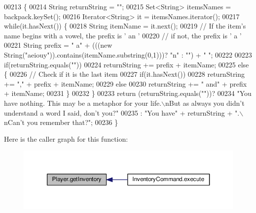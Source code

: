 \begin{DoxyCode}
00213                                  \{
00214         String returnString = \textcolor{stringliteral}{""};
00215         Set<String> itemsNames = backpack.keySet();
00216         Iterator<String> it = itemsNames.iterator();
00217         \textcolor{keywordflow}{while}(it.hasNext()) \{
00218             String itemName = it.next();
00219             \textcolor{comment}{// If the item's name begins with a vowel, the prefix is ' an '}
00220             \textcolor{comment}{// if not, the prefix is ' a '}
00221             String prefix = \textcolor{stringliteral}{" a"} + (((\textcolor{keyword}{new} String(\textcolor{stringliteral}{"aeiouy"})).contains(itemName.substring(0,1)))? \textcolor{stringliteral}{"n"} : \textcolor{stringliteral}{""}) +
       \textcolor{stringliteral}{" "};
00222 
00223             \textcolor{keywordflow}{if}(returnString.equals(\textcolor{stringliteral}{""}))
00224                 returnString += prefix + itemName;
00225             \textcolor{keywordflow}{else} \{
00226                 \textcolor{comment}{// Check if it is the last item}
00227                 \textcolor{keywordflow}{if}(it.hasNext())
00228                     returnString += \textcolor{stringliteral}{","} + prefix + itemName;
00229                 \textcolor{keywordflow}{else}
00230                     returnString += \textcolor{stringliteral}{" and"} + prefix + itemName;
00231             \}
00232         \}
00233         \textcolor{keywordflow}{return} (returnString.equals(\textcolor{stringliteral}{""}))?
00234             \textcolor{stringliteral}{"You have nothing. This may be a metaphor for your life.\(\backslash\)nBut as always you didn't understand a
       word I said, don't you?"}
00235             : \textcolor{stringliteral}{"You have"} + returnString + \textcolor{stringliteral}{".\(\backslash\)nCan't you remember that?"};
00236     \}
\end{DoxyCode}


Here is the caller graph for this function\-:
\nopagebreak
\begin{figure}[H]
\begin{center}
\leavevmode
\includegraphics[width=350pt]{classPlayer_a5c4667e6eca93d1bba69f7db022f2feb_icgraph}
\end{center}
\end{figure}


